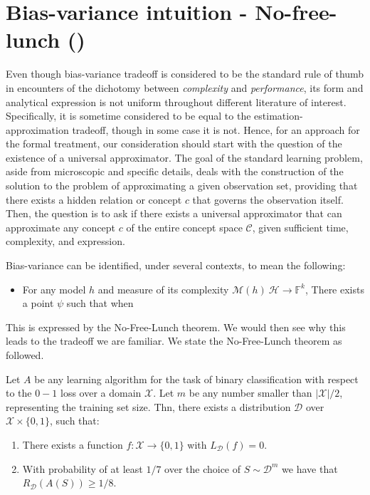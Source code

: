 \documentclass[10pt]{article}
\begin{document}
\section{Bias-variance intuition - No-free-lunch (\cite{10.5555/2371238})}

Even though bias-variance tradeoff is considered to be the standard rule of thumb in encounters of the dichotomy between \textit{complexity} and \textit{performance}, its form and analytical expression is not uniform throughout different literature of interest. Specifically, it is sometime considered to be equal to the estimation-approximation tradeoff, though in some case it is not. Hence, for an approach for the formal treatment, our consideration should start with the question of the existence of a universal approximator. The goal of the standard learning problem, aside from microscopic and specific details, deals with the construction of the solution to the problem of approximating a given observation set, providing that there exists a hidden relation or concept $c$ that governs the observation itself. Then, the question is to ask if there exists a universal approximator that can approximate any concept $c$ of the entire concept space $\mathcal{C}$, given sufficient time, complexity, and expression. 

\begin{conjecture}
    Bias-variance can be identified, under several contexts, to mean the following: \begin{itemize}
        \item For any model $h$ and measure of its complexity $\mathcal{M}(h)\:\mathcal{H}\to \mathbb{F}^{k}$, There exists a point $\psi$ such that when
    \end{itemize}
\end{conjecture}

This is expressed by the No-Free-Lunch theorem. We would then see why this leads to the tradeoff we are familiar. We state the No-Free-Lunch theorem as followed.

\begin{theorem}
    Let $A$ be any learning algorithm for the task of binary classification with respect to the $0-1$ loss over a domain $\mathcal{X}$. Let $m$ be any number smaller than $|\mathcal{X}|/2$, representing the training set size. Thn, there exists a distribution $\mathcal{D}$ over $\mathcal{X}\times \{0,1\}$, such that: 
    \begin{enumerate}
        \item There exists a function $f:\mathcal{X}\to \{0,1\}$ with $L_{\mathcal{D}}(f)= 0$. 
        \item With probability of at least $1/7$ over the choice of $S\sim \mathcal{D}^{m}$ we have that $R_{\mathcal{D}}(A(S))\geq 1/8$. 
    \end{enumerate}
\end{theorem}
\end{document}
